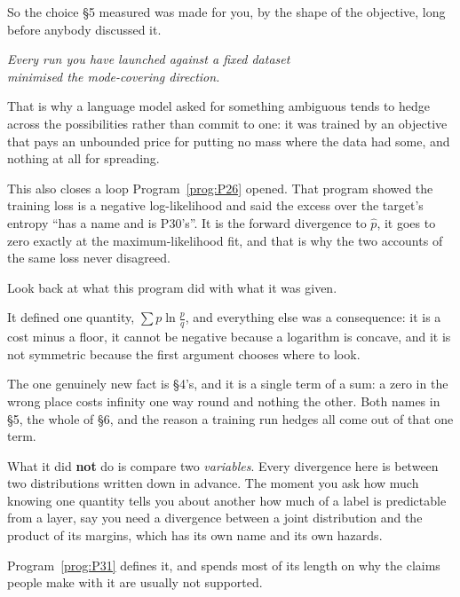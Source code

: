 \begin{fr}
So the choice §5 measured was made for you, by the shape of the objective,
long before anybody discussed it.

\begin{center}
\emph{Every run you have launched against a fixed dataset\\
minimised the mode-covering direction.}
\end{center}

That is why a language model asked for something ambiguous tends to hedge
across the possibilities rather than commit to one: it was trained by an
objective that pays an unbounded price for putting no mass where the data
had some, and nothing at all for spreading.

\begin{note}
This also closes a loop Program~\ref{prog:P26} opened. That program showed
the training loss is a negative log-likelihood and said the excess over the
target's entropy \enquote{has a name and is P30's}. It is the forward
divergence to $\hat p$, it goes to zero exactly at the maximum-likelihood
fit, and that is why the two accounts of the same loss never disagreed.
\end{note}
\end{fr}

\begin{fr}
Look back at what this program did with what it was given.

It defined one quantity, $\sum p \ln \frac{p}{q}$, and everything else was a
consequence: it is a cost minus a floor, it cannot be negative because a
logarithm is concave, and it is not symmetric because the first argument
chooses where to look.

The one genuinely new fact is §4's, and it is a single term of a sum: a zero
in the wrong place costs infinity one way round and nothing the other. Both
names in §5, the whole of §6, and the reason a training run hedges all
come out of that one term.

What it did \textbf{not} do is compare two \emph{variables}. Every divergence
here is between two distributions written down in advance. The moment you ask
how much knowing one quantity tells you about another \dash{} how much of a
label is predictable from a layer, say \dash{} you need a divergence between
a joint distribution and the product of its margins, which has its own name
and its own hazards.

Program~\ref{prog:P31} defines it, and spends most of its length on why the
claims people make with it are usually not supported.
\end{fr}

